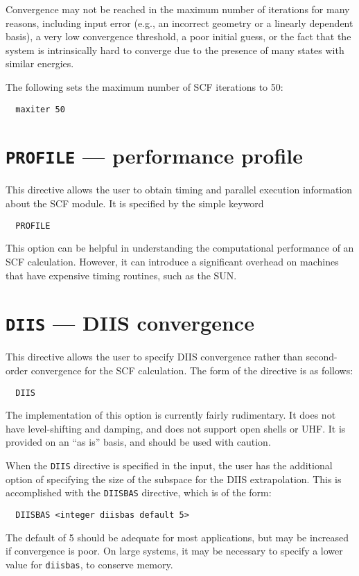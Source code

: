 \fussy

Convergence may not be reached in the maximum number of iterations for
many reasons, including input error (e.g., an incorrect geometry or a
linearly dependent basis), a very low convergence threshold, a poor
initial guess, or the fact that the system is intrinsically hard to
converge due to the presence of many states with similar energies.

The following sets the maximum number of SCF iterations to 50:
\begin{verbatim}
  maxiter 50
\end{verbatim}

\section{{\tt PROFILE} --- performance profile}

This directive allows the user to obtain timing and parallel
execution information about the SCF module.  It is specified by the
simple keyword

\begin{verbatim}
  PROFILE
\end{verbatim}

This option can be helpful in understanding the computational
performance of an SCF calculation.  However,
it can introduce a significant overhead 
on machines that have expensive timing routines, such as the SUN.

\section{{\tt DIIS} --- DIIS convergence}

This directive allows the user to specify DIIS convergence rather than
second-order convergence for the SCF calculation.  The form of the
directive is as follows:

\begin{verbatim}
  DIIS
\end{verbatim}

The implementation of this option is currently fairly rudimentary.  It
does not have level-shifting and damping, and does not support open
shells or UHF.  It is provided on an ``as is'' basis, and should be
used with caution.

When the \verb+DIIS+ directive is specified in the input, the user has
the additional option of specifying the size of the subspace for the
DIIS extrapolation.  This is accomplished with the \verb+DIISBAS+
directive, which is of the form:
\begin{verbatim}
  DIISBAS <integer diisbas default 5>
\end{verbatim}
The default of 5 should be adequate for most applications, but may be
increased if convergence is poor.  On large systems, it may be necessary
to specify a lower value for \verb+diisbas+, to conserve memory.

